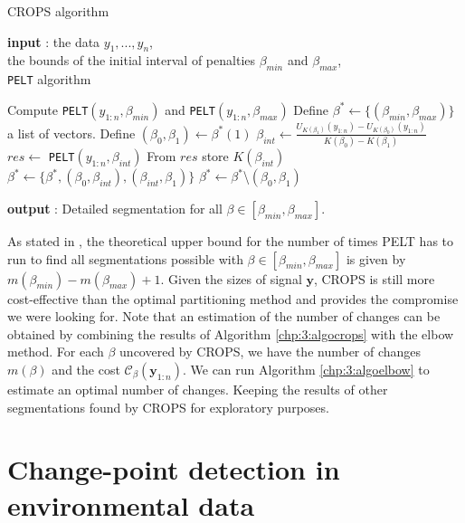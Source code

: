\begin{algorithm}[ht]
\caption{CROPS algorithm}\label{chp:3:algocrops}
\begin{algorithmic}

\State \textbf{input} : the data $y_{1},...,y_{n}$, \\
the bounds of the initial interval of penalties $\beta_{min}$ and $\beta_{max}$, \\
\texttt{PELT} algorithm 
  
\State Compute \texttt{PELT}$(y_{1:n},\beta_{min})$ and \texttt{PELT}$(y_{1:n},\beta_{max})$ 
\State Define $\beta^* \gets \{(\beta_{min},\beta_{max})\}$ a list of vectors.  
\While{$\beta^*\neq \emptyset$}
  \State Define $(\beta_0, \beta_1) \gets \beta^*(1)$
    \State $\beta_{int} \gets \frac{U_{K(\beta_1)}(y_{1:n})-U_{K(\beta_0)}(y_{1:n})}{K(\beta_0)-K(\beta_1)}$
    \State $res \gets$ \texttt{PELT}$(y_{1:n},\beta_{int})$
    \State From $res$ store $K(\beta_{int})$
      \State $\beta^* \gets \{\beta^*,(\beta_0,\beta_{int}),(\beta_{int},\beta_1)\}$
    \EndIf
  \EndIf
  \State $\beta^* \gets \beta^*$\textbackslash$(\beta_0,\beta_1)$
\EndWhile 
   
\State \textbf{output} : Detailed segmentation for all $\beta \in [\beta_{min},\beta_{max}]$. 
\end{algorithmic}
\end{algorithm} 

As stated in \cite{haynes2017}, the theoretical upper bound for the number of times PELT has to run to find all segmentations possible with $\beta\in[\beta_{min},\beta_{max}]$ is given by $m(\beta_{min})-m(\beta_{max})+1$. Given the sizes of signal $\bm y$, CROPS is still more cost-effective than the optimal partitioning method and provides the compromise we were looking for. Note that an estimation of the number of changes can be obtained by combining the results of Algorithm \ref{chp:3:algocrops} with the elbow method. For each $\beta$ uncovered by CROPS, we have the number of changes $m(\beta)$ and the cost $\mathcal{C}_{\beta}(\bm y_{1:n})$. We can run Algorithm \ref{chp:3:algoelbow} to estimate an optimal number of changes. Keeping the results of other segmentations found by CROPS for exploratory purposes. 

\section{Change-point detection in environmental data}\label{chp:3:5}

